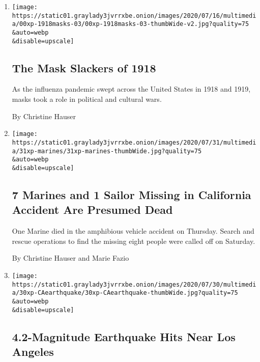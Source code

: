 \begin{enumerate}
\def\labelenumi{\arabic{enumi}.}
\item
  \href{/2020/08/03/us/mask-protests-1918.html}{}

  \texttt{[image: https://static01.graylady3jvrrxbe.onion/images/2020/07/16/multimedia/00xp-1918masks-03/00xp-1918masks-03-thumbWide-v2.jpg?quality=75\\\&auto=webp\\\&disable=upscale]}

  \hypertarget{the-mask-slackers-of-1918}{%
  \subsection{The Mask Slackers of
  1918}\label{the-mask-slackers-of-1918}}

  As the influenza pandemic swept across the United States in 1918 and
  1919, masks took a role in political and cultural wars.

  By Christine Hauser
\item
  \href{/2020/07/31/us/marine-accident-california.html}{}

  \texttt{[image: https://static01.graylady3jvrrxbe.onion/images/2020/07/31/multimedia/31xp-marines/31xp-marines-thumbWide.jpg?quality=75\\\&auto=webp\\\&disable=upscale]}

  \hypertarget{7-marines-and-1-sailor-missing-in-california-accident-are-presumed-dead}{%
  \subsection{7 Marines and 1 Sailor Missing in California Accident Are
  Presumed
  Dead}\label{7-marines-and-1-sailor-missing-in-california-accident-are-presumed-dead}}

  One Marine died in the amphibious vehicle accident on Thursday. Search
  and rescue operations to find the missing eight people were called off
  on Saturday.

  By Christine Hauser and Marie Fazio
\item
  \href{/2020/07/30/us/california-earthquake.html}{}

  \texttt{[image: https://static01.graylady3jvrrxbe.onion/images/2020/07/30/multimedia/30xp-CAearthquake/30xp-CAearthquake-thumbWide.jpg?quality=75\\\&auto=webp\\\&disable=upscale]}

  \hypertarget{42-magnitude-earthquake-hits-near-los-angeles}{%
  \subsection{4.2-Magnitude Earthquake Hits Near Los
  Angeles}\label{42-magnitude-earthquake-hits-near-los-angeles}}


\end{enumerate}
